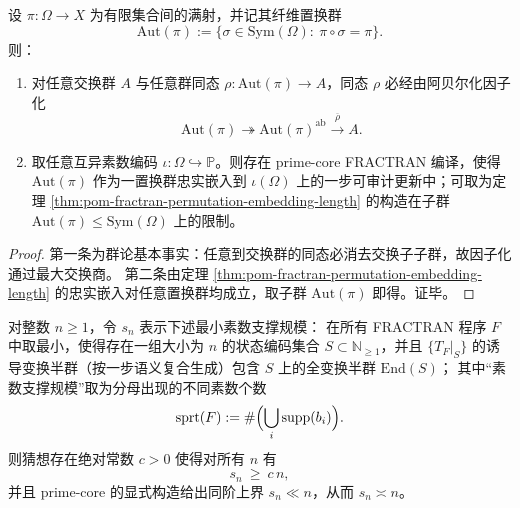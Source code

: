 \begin{proposition}\label{prop:pom-fractran-commutative-vs-algorithmic-externalization}
设 \(\pi:\Omega\to X\) 为有限集合间的满射，并记其纤维置换群
\[
\mathrm{Aut}(\pi):=\{\sigma\in\mathrm{Sym}(\Omega):\ \pi\circ\sigma=\pi\}.
\]
则：
\begin{enumerate}
  \item 对任意交换群 \(A\) 与任意群同态 \(\rho:\mathrm{Aut}(\pi)\to A\)，同态 \(\rho\) 必经由阿贝尔化因子化
  \[
  \mathrm{Aut}(\pi)\twoheadrightarrow \mathrm{Aut}(\pi)^{\mathrm{ab}}\xrightarrow{\ \overline\rho\ } A.
  \]
  \item 取任意互异素数编码 \(\iota:\Omega\hookrightarrow\mathbb P\)。则存在 prime-core FRACTRAN 编译，使得 \(\mathrm{Aut}(\pi)\) 作为一置换群忠实嵌入到 \(\iota(\Omega)\) 上的一步可审计更新中；可取为定理 \ref{thm:pom-fractran-permutation-embedding-length} 的构造在子群 \(\mathrm{Aut}(\pi)\le \mathrm{Sym}(\Omega)\) 上的限制。
\end{enumerate}
\end{proposition}
\begin{proof}
第一条为群论基本事实：任意到交换群的同态必消去交换子子群，故因子化通过最大交换商。
第二条由定理 \ref{thm:pom-fractran-permutation-embedding-length} 的忠实嵌入对任意置换群均成立，取子群 \(\mathrm{Aut}(\pi)\) 即得。证毕。
\end{proof}

\begin{conjecture}\label{conj:pom-fractran-min-prime-support-linear}
对整数 \(n\ge 1\)，令 \(s_n\) 表示下述最小素数支撑规模：
在所有 FRACTRAN 程序 \(F\) 中取最小，使得存在一组大小为 \(n\) 的状态编码集合 \(S\subset\mathbb N_{\ge 1}\)，并且 \(\{T_F|_{S}\}\) 的诱导变换半群（按一步语义复合生成）包含 \(S\) 上的全变换半群 \(\mathrm{End}(S)\)；
其中“素数支撑规模”取为分母出现的不同素数个数
\[
\mathrm{sprt}(F):=\#\Bigl(\bigcup_{i}\mathrm{supp}(b_i)\Bigr).
\]
则猜想存在绝对常数 \(c>0\) 使得对所有 \(n\) 有
\[
s_n\ \ge\ c\,n,
\]
并且 prime-core 的显式构造给出同阶上界 \(s_n\ll n\)，从而 \(s_n\asymp n\)。
\end{conjecture}


